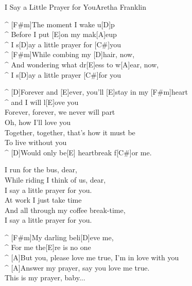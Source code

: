 \begin{song}{I Say a Little Prayer for You}{Aretha Franklin}

\begin{guitar}
^ [F#m]The moment I wake u[D]p\\
^ Before I put [E]on my mak[A]eup\\
^ I s[D]ay a little prayer for [C#]you\\
^ [F#m]While combing my [D]hair, now,\\
^ And wondering what dr[E]ess to w[A]ear, now,\\
^ I s[D]ay a little prayer [C#]for you\\
\end{guitar}

\begin{guitar}
^ [D]Forever and [E]ever, you'll [E]stay in my [F#m]heart\\
^ and I will l[E]ove you\\
Forever, forever, we never will part\\
Oh, how I'll love you\\
Together, together, that's how it must be\\
To live without you\\
^ [D]Would only be[E] heartbreak f[C#]or me.\\
\end{guitar}

\begin{guitar}
I run for the bus, dear,\\
While riding I think of us, dear,\\
I say a little prayer for you.\\
At work I just take time\\
And all through my coffee break-time,\\
I say a little prayer for you.\\
\end{guitar}


\begin{guitar}
^ [F#m]My darling beli[D]eve me,\\
^ For me the[E]re is no one\\
^ [A]But you, please love me true, I'm in love with you\\
^ [A]Answer my prayer, say you love me true.\\
This is my prayer, baby...\\
\end{guitar}


\end{song}

